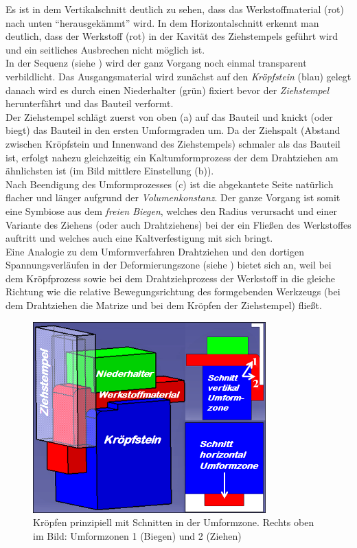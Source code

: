 \documentclass[12pt,a4paper,parskip]{scrartcl}
\begin{document}
 Es ist in dem Vertikalschnitt deutlich zu sehen, dass das Werkstoffmaterial (rot) nach unten "`herausgekämmt"' wird. In dem Horizontalschnitt erkennt man deutlich,  dass der Werkstoff (rot) in der Kavität des Ziehstempels geführt wird und ein seitliches Ausbrechen nicht möglich ist.\\ In der Sequenz (siehe ) wird der ganz Vorgang noch einmal transparent verbildlicht. Das Ausgangsmaterial wird zunächst auf den \emph{Kröpfstein} (blau) gelegt danach wird es durch einen Niederhalter (grün) fixiert bevor der \emph{Ziehstempel} herunterfährt und das Bauteil verformt. \\    Der Ziehstempel schlägt zuerst von oben  (a) auf das Bauteil  und knickt (oder biegt) das Bauteil in den ersten Umformgraden um. Da der Ziehspalt (Abstand zwischen Kröpfstein und Innenwand des Ziehstempels) schmaler als das Bauteil ist, erfolgt nahezu gleichzeitig  ein Kaltumformprozess der dem Drahtziehen am ähnlichsten ist (im Bild mittlere Einstellung (b)). \\ Nach Beendigung des Umformprozesses (c) ist die abgekantete Seite natürlich flacher und länger aufgrund der \emph{Volumenkonstanz}. Der ganze Vorgang ist somit eine Symbiose aus dem \emph{freien Biegen}, welches den Radius verursacht und einer Variante des Ziehens (oder auch Drahtziehens) bei der ein Fließen des Werkstoffes auftritt und welches auch eine Kaltverfestigung mit sich bringt. \\
Eine Analogie zu dem Umformverfahren Drahtziehen und den dortigen Spannungsverläufen in der Deformierungszone (siehe ) bietet sich an, weil bei dem Kröpfprozess sowie bei dem Drahtziehprozess der Werkstoff in die gleiche Richtung wie die relative Bewegungsrichtung des  formgebenden Werkzeugs (bei dem Drahtziehen die Matrize und bei dem Kröpfen der Ziehstempel) fließt.\\
\begin{figure}[hbtp]
\centering
\includegraphics[width=0.8\textwidth]{krpfgesamt.png}
\caption{Kröpfen prinzipiell mit Schnitten in der Umformzone. Rechts oben im Bild: Umformzonen 1 (Biegen) und 2 (Ziehen)}
\label{fig:krpfgesamt}
\end{figure}
\end{document}
